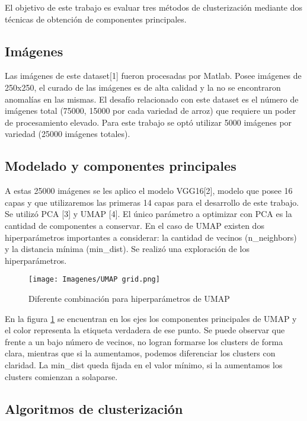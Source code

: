 \documentclass{article}
\begin{document}
El objetivo de este trabajo es evaluar tres métodos de clusterización mediante dos técnicas de obtención de componentes principales.

\subsection{Imágenes}

Las imágenes de este dataset[1] fueron procesadas por Matlab. Posee imágenes de 250x250, el curado de las imágenes es de alta calidad y la no se encontraron anomalías en las mismas. El desafío relacionado con este dataset es el número de imágenes total (75000, 15000 por cada variedad de arroz) que requiere un poder de procesamiento elevado. Para este trabajo se optó utilizar 5000 imágenes por variedad (25000 imágenes totales).

\subsection{Modelado y componentes principales}

A estas 25000 imágenes se les aplico el modelo VGG16[2], modelo que posee 16 capas y que utilizaremos las primeras 14 capas para el desarrollo de este trabajo.
Se utilizó PCA [3] y UMAP [4]. El único parámetro a optimizar con PCA es la cantidad de componentes a conservar. En el caso de UMAP existen dos hiperparámetros importantes a considerar: la cantidad de vecinos  (n\_neighbors) y la distancia mínima  (min\_dist). Se realizó una exploración de los hiperparámetros.

\begin{figure}[!hb]
    \centering
    \texttt{[image: Imagenes/UMAP grid.png]}
    \caption{Diferente combinación para hiperparámetros de UMAP}
    \label{fig:UMAP HP}
\end{figure}

En la figura \ref{fig:UMAP HP} se encuentran en los ejes los componentes principales de UMAP y el color representa la etiqueta verdadera de ese punto. Se puede observar que frente a un bajo número de vecinos, no logran formarse los clusters de forma clara, mientras que si la aumentamos, podemos diferenciar los clusters con claridad. La min\_dist queda fijada en el valor mínimo, si la aumentamos los clusters comienzan a solaparse.

\subsection{Algoritmos de clusterización}
\end{document}
